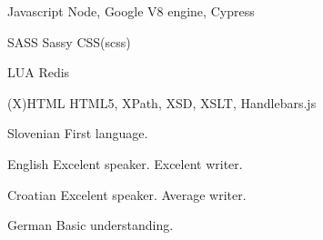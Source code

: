 \begin{cvskills}
\cvskill
{Javascript} %
{Node, Google V8 engine, Cypress} %

\cvskill
{SASS} %
{Sassy CSS(scss)} %

\cvskill
{LUA} %
{Redis} %

\cvskill
{(X)HTML} %
{HTML5, XPath, XSD, XSLT, Handlebars.js} %
\end{cvskills}




\begin{cvskills}


\cvskill
{Slovenian} %
{First language.} %


\cvskill
{English} %
{Excelent speaker. Excelent writer.} %


\cvskill
{Croatian} %
{Excelent speaker. Average writer.} %


\cvskill
{German} %
{Basic understanding.} %

\end{cvskills}


